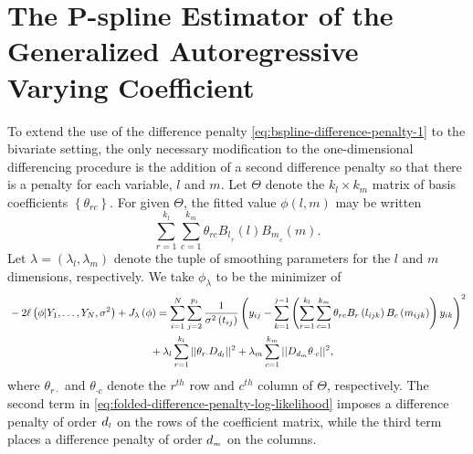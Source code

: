 \section{The P-spline Estimator of the Generalized Autoregressive Varying Coefficient}

To extend the use of the difference penalty \eqref{eq:bspline-difference-penalty-1} to the bivariate setting, the only necessary modification to the one-dimensional differencing procedure is the addition of a second difference penalty so that there is a penalty for each variable, $l$ and $m$. Let $\Theta$ denote the $k_l \times k_m$ matrix of basis coefficients $\left\{\theta_{rc}\right\}$. For given $\Theta$, the fitted value $\phi\left(l,m\right)$ may be written 
\[
\sum_{r=1}^{k_l} \sum_{c=1}^{k_m} \theta_{rc} {B_l}_{_{r}}\left(l\right){B_m}_{_{c}}\left(m\right).
\]
\noindent
Let $\lambda = \left(\lambda_l, \lambda_m\right)$ denote the tuple of smoothing parameters for the $l$ and $m$ dimensions, respectively. We take $\phi_\lambda$ to be the minimizer of 
\begin{align} 
\begin{split}\label{eq:folded-difference-penalty-log-likelihood}
&-2\ell\left(\phi \vert Y_1,\dots, Y_N, \sigma^2\right) + J_{\lambda}\left(\phi\right) = \sum_{i=1}^N \sum_{j=2}^{p_i} \frac{1}{\sigma^{2}\left({t_{ij}}\right)} \left(y_{ij} - \sum_{k=1}^{j-1} \left( \sum_{r=1}^{k_l} \sum_{c=1}^{k_m} \theta_{rc} B_r\left(l_{ijk}\right)B_c\left(m_{ijk}\right)\right)y_{ik} \right)^2 \\ 
&\phantom{{} - 2\ell\left(\phi \vert Y_1,\dots, Y_N\right) + J_{\lambda}\left(\phi\right) =  } + \lambda_l \sum_{r=1}^{k_l} \vert\vert \theta_{r \cdot}  D_{d_{\ms l}} \vert\vert^2 + \lambda_m \sum_{c=1}^{k_m}\vert \vert  D_{d_{\ms m}} \theta_{\cdot c} \vert\vert^2,
\end{split}
\end{align}
\noindent
where $\theta_{r \cdot}$ and $\theta_{\cdot c}$ denote the $r^{th}$ row and $c^{th}$ column of $\Theta$, respectively. The second term in \eqref{eq:folded-difference-penalty-log-likelihood} imposes a difference penalty of order $d_{\scriptscriptstyle l}$ on the rows of the coefficient matrix, while the third term places a difference penalty of order $d_{\scriptscriptstyle m}$ on the columns. 

\bigskip


